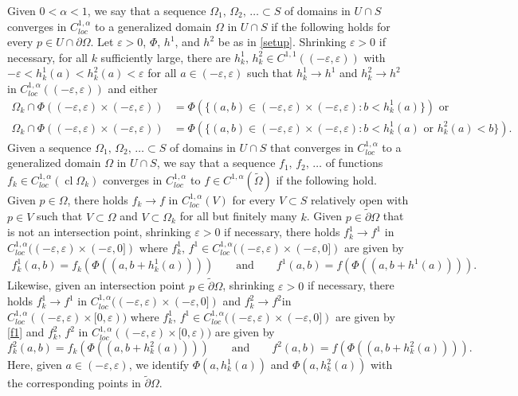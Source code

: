 \documentclass[11pt]{amsart}
\begin{document}
\begin{appendices}
Given $0<\alpha<1$, we say that a sequence $\Omega_1,\,\Omega_2,\,\ldots\subset S$ of domains in  $U \cap S$ converges in $C_{loc}^{1,\alpha}$ to a generalized domain $\Omega$ in $U\cap S$ if   the following holds for every $p\in U\cap \partial \Omega$. Let $\varepsilon>0$, $\Phi$, $h^1$, and $h^2$ be as in \eqref{setup}. Shrinking $\varepsilon>0$ if necessary, for all $k$ sufficiently large, there are $h^1_k,\,h^2_k\in C^{1,1}((-\varepsilon,\varepsilon))$ with $-\varepsilon<h^1_k(a)<h^2_k(a)<\varepsilon$ for all $a\in(-\varepsilon,\varepsilon)$ such that $h^1_k\to h^1$ and $h^2_k\to h^2$ in $C^{1,\alpha}_{loc}((-\varepsilon,\varepsilon))$  and either
\begin{equation*}
	\begin{aligned} 
\Omega_k\cap\Phi((-\varepsilon,\varepsilon)\times(-\varepsilon,\varepsilon))&=\Phi(\{(a,b)\in(-\varepsilon,\varepsilon)\times(-\varepsilon,\varepsilon): b<h^1_k(a)\})\text{ or}\\
\Omega_k\cap\Phi((-\varepsilon,\varepsilon)\times(-\varepsilon,\varepsilon))&=\Phi(\{(a,b)\in(-\varepsilon,\varepsilon)\times(-\varepsilon,\varepsilon): b<h^1_k(a)\text{ or } h^2_k(a)<b\}).
\end{aligned} 
\end{equation*}
 Given a sequence $\Omega_1,\,\Omega_2,\,\ldots \subset S$ of domains  in $U \cap S$ that converges in $C^{1,\alpha}_{loc}$ to a generalized domain $\Omega$ in $U\cap S$, we say that a sequence $f_1,\,f_2,\,\ldots$ of functions $f_k\in C_{loc}^{1,\alpha}(\operatorname{cl}\Omega_k)$ converges in $C^{1,\alpha}_{loc}$ to $f\in C^{1,\alpha}(\tilde \Omega)$ if the following hold. Given $p\in \Omega$, there holds $f_k\to f$ in $C^{1,\alpha}_{loc}(V)$ for every $V\subset S$ relatively open with $p\in V$ such that $V\subset \Omega$ and $V\subset \Omega_k$ for all but finitely many $k$. Given $p\in \tilde \partial \Omega$ that is not an intersection point, shrinking $\varepsilon>0$ if necessary, there holds $ f^1_k\to f^1$ in  $C_{loc}^{1,\alpha}((-\varepsilon,\varepsilon)\times(-\varepsilon,0])$ where $f^1_k,\,f^1\in C_{loc}^{1,\alpha}((-\varepsilon,\varepsilon)\times(-\varepsilon,0])$ are given by
 \begin{align} \label{f1} 
 f^1_k(a,b)=f_k(\Phi((a,b+h^1_k(a))))\qquad\text{and}\qquad f^1(a,b)=f(\Phi((a,b+h^1(a)))).
 \end{align} 
Likewise, given an intersection point $p\in \tilde \partial \Omega$,  shrinking $\varepsilon>0$ if necessary, there holds $ f^1_k\to f^1$  in  $C_{loc}^{1,\alpha}((-\varepsilon,\varepsilon)\times(-\varepsilon,0])$ and $f^2_k\to f^2$in $C_{loc}^{1,\alpha}((-\varepsilon,\varepsilon)\times[0,\varepsilon))$ where $f^1_k,\,f^1\in C_{loc}^{1,\alpha}((-\varepsilon,\varepsilon)\times(-\varepsilon,0])$ are given by \eqref{f1}
and $f^2_k,\,f^2$ in  $C_{loc}^{1,\alpha}((-\varepsilon,\varepsilon)\times[0,\varepsilon))$ are given by
$$
f^2_k(a,b)=f_k(\Phi((a,b+h^2_k(a))))\qquad\text{and}\qquad f^2(a,b)=f(\Phi((a,b+h^2_k(a)))).
$$
Here, given $a\in(-\varepsilon,\varepsilon)$, we identify $\Phi(a,h^1_k(a))$ and $\Phi(a,h^2_k(a))$ with the corresponding points in $\tilde \partial \Omega$. 
 

\end{appendices}
\end{document}
